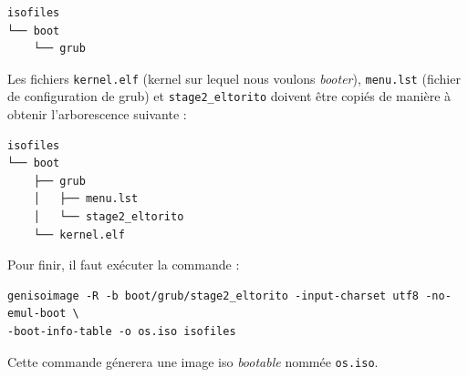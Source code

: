 \begin{verbatim}
isofiles
└── boot
    └── grub
\end{verbatim}

Les fichiers \texttt{kernel.elf} (kernel sur lequel nous voulons
\textit{booter}), \texttt{menu.lst} (fichier de configuration de \acrshort{grub})
et \texttt{stage2_eltorito} doivent être copiés de manière à obtenir
l'arborescence suivante :

\begin{verbatim}
isofiles
└── boot
    ├── grub
    │   ├── menu.lst
    │   └── stage2_eltorito
    └── kernel.elf
\end{verbatim}

Pour finir, il faut exécuter la commande :
\begin{verbatim}
genisoimage -R -b boot/grub/stage2_eltorito -input-charset utf8 -no-emul-boot \
-boot-info-table -o os.iso isofiles
\end{verbatim}
Cette commande génerera une image \acrshort{iso} \textit{bootable} nommée \texttt{os.iso}\cite{ref42}.